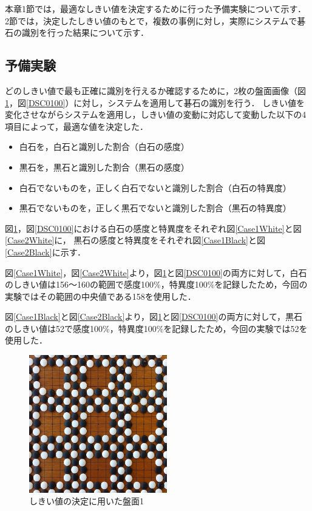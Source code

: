 \documentclass[openright]{nitocs}
\numberwithin{equation}{section}
\begin{document}
        本章1節では，最適なしきい値を決定するために行った予備実験について示す．
        2節では，決定したしきい値のもとで，複数の事例に対し，実際にシステムで碁石の識別を行った結果について示す．

        \subsection{予備実験} \label{threshold}
            どのしきい値で最も正確に識別を行えるか確認するために，2枚の盤面画像（図\ref{DSC0087}，図\ref{DSC0100}）に対し，システムを適用して碁石の識別を行う．
            しきい値を変化させながらシステムを適用し，しきい値の変動に対応して変動した以下の4項目によって，最適な値を決定した．
            \begin{itemize}
                \item 白石を，白石と識別した割合（白石の感度）
                \item 黒石を，黒石と識別した割合（黒石の感度）
                \item 白石でないものを，正しく白石でないと識別した割合（白石の特異度）
                \item 黒石でないものを，正しく黒石でないと識別した割合（黒石の特異度）
            \end{itemize}

            図\ref{DSC0087}，図\ref{DSC0100}における白石の感度と特異度をそれぞれ図\ref{Case1White}と図\ref{Case2White}に，
            黒石の感度と特異度をそれぞれ図\ref{Case1Black}と図\ref{Case2Black}に示す．

            図\ref{Case1White}，図\ref{Case2White}より，図\ref{DSC0087}と図\ref{DSC0100}の両方に対して，白石のしきい値は156～160の範囲で感度100\%，特異度100\%を記録したため，今回の実験ではその範囲の中央値である158を使用した．

            図\ref{Case1Black}と図\ref{Case2Black}より，図\ref{DSC0087}と図\ref{DSC0100}の両方に対して，黒石のしきい値は52で感度100\%，特異度100\%を記録したため，今回の実験では52を使用した．

            \begin{figure}[tb] %
                \begin{center}
                \includegraphics[clip,width=60mm]{DSC_0087/boardImg.jpg} 
                \caption{しきい値の決定に用いた盤面1}
                \label{DSC0087}
                \end{center}
            \end{figure}
\end{document}
